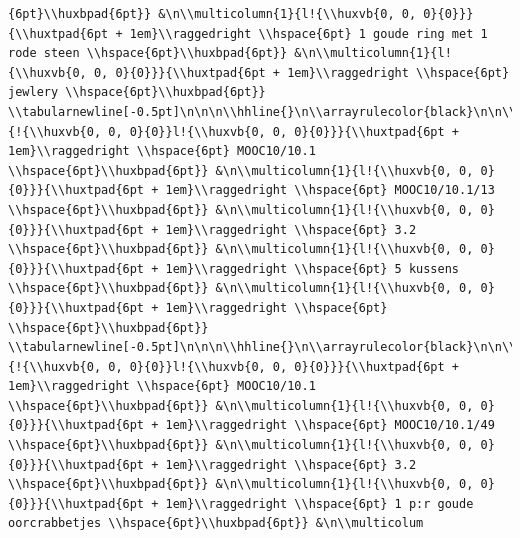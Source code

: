 \documentclass[11pt,preprint, authoryear]{elsarticle}
\numberwithin{equation}{section}
\numberwithin{figure}{section}
\numberwithin{table}{section}
\begin{document}
\begin{verbatim}
{6pt}\\huxbpad{6pt}} &\n\\multicolumn{1}{l!{\\huxvb{0, 0, 0}{0}}}{\\huxtpad{6pt + 1em}\\raggedright \\hspace{6pt} 1 goude ring met 1 rode steen \\hspace{6pt}\\huxbpad{6pt}} &\n\\multicolumn{1}{l!{\\huxvb{0, 0, 0}{0}}}{\\huxtpad{6pt + 1em}\\raggedright \\hspace{6pt} jewlery \\hspace{6pt}\\huxbpad{6pt}} \\tabularnewline[-0.5pt]\n\n\n\\hhline{}\n\\arrayrulecolor{black}\n\n\\multicolumn{1}{!{\\huxvb{0, 0, 0}{0}}l!{\\huxvb{0, 0, 0}{0}}}{\\huxtpad{6pt + 1em}\\raggedright \\hspace{6pt} MOOC10/10.1 \\hspace{6pt}\\huxbpad{6pt}} &\n\\multicolumn{1}{l!{\\huxvb{0, 0, 0}{0}}}{\\huxtpad{6pt + 1em}\\raggedright \\hspace{6pt} MOOC10/10.1/13 \\hspace{6pt}\\huxbpad{6pt}} &\n\\multicolumn{1}{l!{\\huxvb{0, 0, 0}{0}}}{\\huxtpad{6pt + 1em}\\raggedright \\hspace{6pt} 3.2 \\hspace{6pt}\\huxbpad{6pt}} &\n\\multicolumn{1}{l!{\\huxvb{0, 0, 0}{0}}}{\\huxtpad{6pt + 1em}\\raggedright \\hspace{6pt} 5 kussens \\hspace{6pt}\\huxbpad{6pt}} &\n\\multicolumn{1}{l!{\\huxvb{0, 0, 0}{0}}}{\\huxtpad{6pt + 1em}\\raggedright \\hspace{6pt}  \\hspace{6pt}\\huxbpad{6pt}} \\tabularnewline[-0.5pt]\n\n\n\\hhline{}\n\\arrayrulecolor{black}\n\n\\multicolumn{1}{!{\\huxvb{0, 0, 0}{0}}l!{\\huxvb{0, 0, 0}{0}}}{\\huxtpad{6pt + 1em}\\raggedright \\hspace{6pt} MOOC10/10.1 \\hspace{6pt}\\huxbpad{6pt}} &\n\\multicolumn{1}{l!{\\huxvb{0, 0, 0}{0}}}{\\huxtpad{6pt + 1em}\\raggedright \\hspace{6pt} MOOC10/10.1/49 \\hspace{6pt}\\huxbpad{6pt}} &\n\\multicolumn{1}{l!{\\huxvb{0, 0, 0}{0}}}{\\huxtpad{6pt + 1em}\\raggedright \\hspace{6pt} 3.2 \\hspace{6pt}\\huxbpad{6pt}} &\n\\multicolumn{1}{l!{\\huxvb{0, 0, 0}{0}}}{\\huxtpad{6pt + 1em}\\raggedright \\hspace{6pt} 1 p:r goude oorcrabbetjes \\hspace{6pt}\\huxbpad{6pt}} &\n\\multicolum
\end{verbatim}
\end{document}
